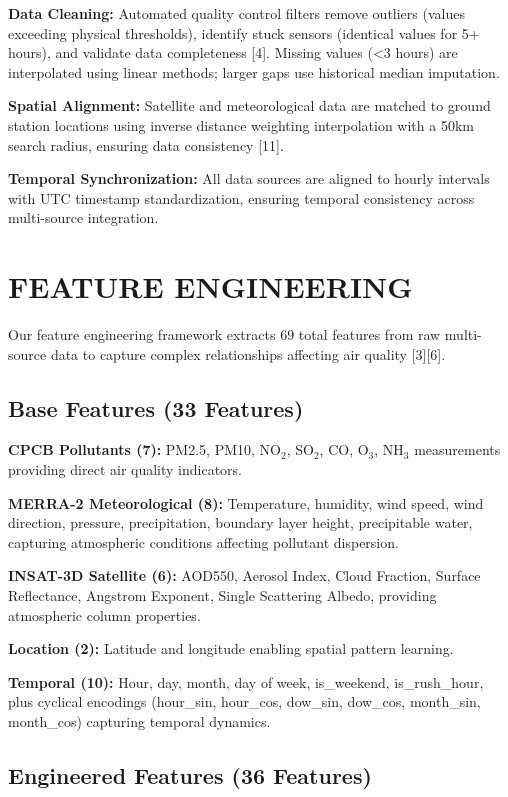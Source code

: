 \documentclass[10pt,twocolumn]{article}
\begin{document}
\textbf{Data Cleaning:} Automated quality control filters remove outliers (values exceeding physical thresholds), identify stuck sensors (identical values for 5+ hours), and validate data completeness [4]. Missing values (<3 hours) are interpolated using linear methods; larger gaps use historical median imputation.

\textbf{Spatial Alignment:} Satellite and meteorological data are matched to ground station locations using inverse distance weighting interpolation with a 50km search radius, ensuring data consistency [11].

\textbf{Temporal Synchronization:} All data sources are aligned to hourly intervals with UTC timestamp standardization, ensuring temporal consistency across multi-source integration.

\section{FEATURE ENGINEERING}

Our feature engineering framework extracts 69 total features from raw multi-source data to capture complex relationships affecting air quality [3][6].

\subsection{Base Features (33 Features)}

\textbf{CPCB Pollutants (7):} PM2.5, PM10, NO$_2$, SO$_2$, CO, O$_3$, NH$_3$ measurements providing direct air quality indicators.

\textbf{MERRA-2 Meteorological (8):} Temperature, humidity, wind speed, wind direction, pressure, precipitation, boundary layer height, precipitable water, capturing atmospheric conditions affecting pollutant dispersion.

\textbf{INSAT-3D Satellite (6):} AOD550, Aerosol Index, Cloud Fraction, Surface Reflectance, Angstrom Exponent, Single Scattering Albedo, providing atmospheric column properties.

\textbf{Location (2):} Latitude and longitude enabling spatial pattern learning.

\textbf{Temporal (10):} Hour, day, month, day of week, is\_weekend, is\_rush\_hour, plus cyclical encodings (hour\_sin, hour\_cos, dow\_sin, dow\_cos, month\_sin, month\_cos) capturing temporal dynamics.

\subsection{Engineered Features (36 Features)}
\end{document}
